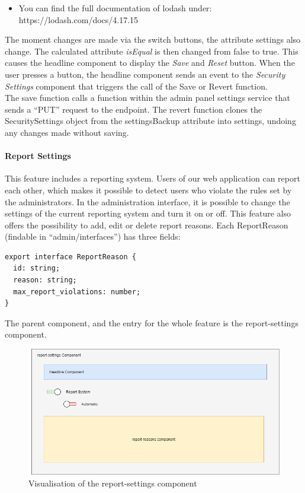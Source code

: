 \begin{itemize}
    \item You can find the full documentation of lodash under: https://lodash.com/docs/4.17.15
\end{itemize}

The moment changes are made via the switch buttons, the attribute settings also change.
The calculated attribute \textit{isEqual} is then changed from false to true.
This causes the headline component to display the \textit{Save} and \textit{Reset} button.
When the user presses a button, the headline component sends an event to the \textit{Security Settings} component that
triggers the call of the Save or Revert function. \\
The save function calls a function within the admin panel settings service that sends a \enquote{PUT} request to the
endpoint.
The revert function clones the SecuritySettings object from the settingsBackup attribute into settings, undoing any changes made without saving.

\paragraph{Report Settings}
This feature includes a reporting system.
Users of our web application can report each other, which makes it possible to detect users who violate the rules set
by the administrators.
In the administration interface, it is possible to change the settings of the current reporting system and turn it on
or off.
This feature also offers the possibility to add, edit or delete report reasons.
Each ReportReason (findable in \enquote{admin/interfaces}) has three fields:

\begin{verbatim}
export interface ReportReason {
  id: string;
  reason: string;
  max_report_violations: number;
}
\end{verbatim}

The parent component, and the entry for the whole feature is the report-settings component.

\begin{figure}[H]
    \centering
    \includegraphics[width=1.0\textwidth]{./images/report_settings_1}
    \caption{Visualisation of the report-settings component}
    \label{fig:reportset}
\end{figure}

